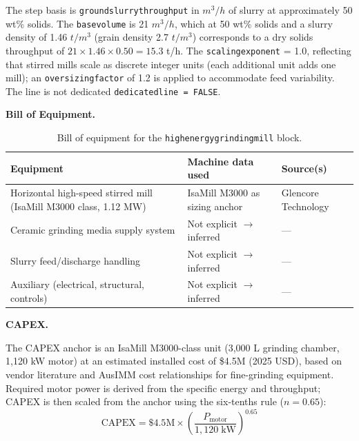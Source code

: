 \documentclass{article}
\renewcommand\_{\textunderscore\allowbreak}
\begin{document}
The step basis is \texttt{ground\_slurry\_throughput} in $\si{m^3/h}$ of slurry at approximately 50 wt\% solids. The \texttt{base\_volume} is 21 $\si{m^3/h}$, which at 50 wt\% solids and a slurry density of 1.46 $\si{t/m^3}$ (grain density 2.7 $\si{t/m^3}$) corresponds to a dry solids throughput of $21 \times 1.46 \times 0.50 = 15.3$ t/h. The \texttt{scaling\_exponent} = 1.0, reflecting that stirred mills scale as discrete integer units (each additional unit adds one mill); an \texttt{oversizing\_factor} of 1.2 is applied to accommodate feed variability. The line is not dedicated \texttt{dedicated\_line = FALSE}.

\medskip
\noindent\textbf{Bill of Equipment.}\quad

\begin{table}[h!]
\caption{Bill of equipment for the \texttt{high\_energy\_grinding\_mill} block.}
\centering
\begin{tabular}{>{\raggedright\arraybackslash}p{5.2cm}
				>{\raggedright\arraybackslash}p{4cm}
				>{\raggedright\arraybackslash}p{4.5cm}}
\toprule
\textbf{Equipment} & \textbf{Machine data used} & \textbf{Source(s)} \\
\midrule
Horizontal high-speed stirred mill (IsaMill M3000 class, 1.12 MW) & IsaMill M3000 as sizing anchor & Glencore Technology \\
Ceramic grinding media supply system & Not explicit $\rightarrow$ inferred & --- \\
Slurry feed/discharge handling & Not explicit $\rightarrow$ inferred & --- \\
Auxiliary (electrical, structural, controls) & Not explicit $\rightarrow$ inferred & --- \\
\bottomrule
\end{tabular}
\end{table}


\medskip
\noindent\textbf{CAPEX.}\quad

The CAPEX anchor is an IsaMill M3000-class unit (3,000 L grinding chamber, 1,120 kW motor) at an estimated installed cost of \$4.5M (2025 USD), based on vendor literature and AusIMM cost relationships for fine-grinding equipment. Required motor power is derived from the specific energy and throughput; CAPEX is then scaled from the anchor using the six-tenths rule ($n = 0.65$):
\[
	\text{CAPEX} = \$4.5\text{M} \times \left(\frac{P_{\text{motor}}}{1,120\;\text{kW}}\right)^{0.65}
\]
\end{document}
